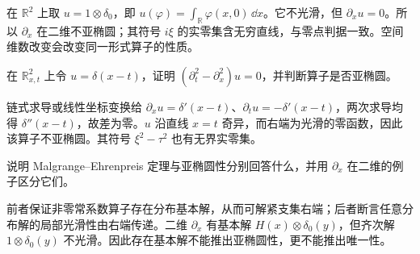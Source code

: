 \begin{example}[只沿一个方向求导不会消去横向奇性]
在 $\mathbb R^2$ 上取 $u=1\otimes\delta_0$，即 $u(\varphi)=\int_{\mathbb R}\varphi(x,0)\,\dd x$。它不光滑，但 $\partial_xu=0$。所以 $\partial_x$ 在二维不亚椭圆；其符号 $i\xi$ 的实零集含无穷直线，与零点判据一致。空间维数改变会改变同一形式算子的性质。
\end{example}

\begin{exercise}[波动算子的反例]\label{ex:y6-wave}
在 $\mathbb R^2_{x,t}$ 上令 $u=\delta(x-t)$，证明 $(\partial_t^2-\partial_x^2)u=0$，并判断算子是否亚椭圆。
\end{exercise}
\begin{solution}
链式求导或线性坐标变换给 $\partial_xu=\delta'(x-t)$、$\partial_tu=-\delta'(x-t)$，两次求导均得 $\delta''(x-t)$，故差为零。$u$ 沿直线 $x=t$ 奇异，而右端为光滑的零函数，因此该算子不亚椭圆。其符号 $\xi^2-\tau^2$ 也有无界实零集。
\end{solution}

\begin{exercise}[分离存在性与正则性]\label{ex:y6-existence-vs-regularity}
说明 Malgrange--Ehrenpreis 定理与亚椭圆性分别回答什么，并用 $\partial_x$ 在二维的例子区分它们。
\end{exercise}
\begin{solution}
前者保证非零常系数算子存在分布基本解，从而可解紧支集右端；后者断言任意分布解的局部光滑性由右端传递。二维 $\partial_x$ 有基本解 $H(x)\otimes\delta_0(y)$，但齐次解 $1\otimes\delta_0(y)$ 不光滑。因此存在基本解不能推出亚椭圆性，更不能推出唯一性。
\end{solution}
